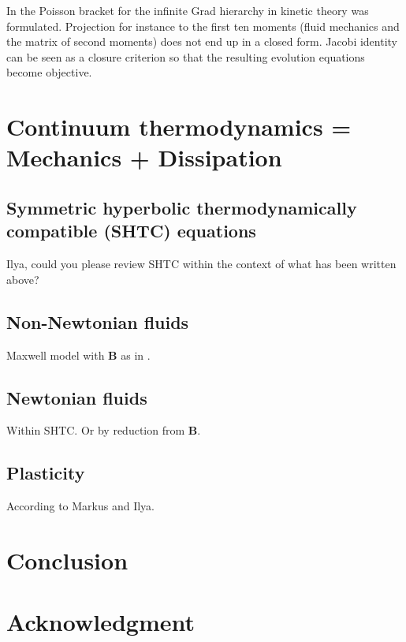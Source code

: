 \documentclass[
10pt, %
a4paper, %
oneside, %
headinclude,footinclude, %
BCOR5mm, %
]{scrartcl}
\newcommand{\BB}{\mathbf{B}}
\begin{document}
In \cite{Miroslav-Grad} the Poisson bracket for the infinite Grad hierarchy in kinetic theory was formulated. Projection for instance to the first ten moments (fluid mechanics and the matrix of second moments) does not end up in a closed form. Jacobi identity can be seen as a closure criterion so that the resulting evolution equations become objective.


\section{Continuum thermodynamics = Mechanics + Dissipation}

\subsection{Symmetric hyperbolic thermodynamically compatible (SHTC) equations}
Ilya, could you please review SHTC within the context of what has been written above?

\subsection{Non-Newtonian fluids}
Maxwell model with $\BB$ as in \cite{PKG}.

\subsection{Newtonian fluids}
Within SHTC. Or by reduction from $\BB$.

\subsection{Plasticity}\label{sec.plasticity}
According to Markus and Ilya. 

\section{Conclusion}

\section*{Acknowledgment}


\renewcommand{\refname}{\spacedlowsmallcaps{References}} %
\end{document}
